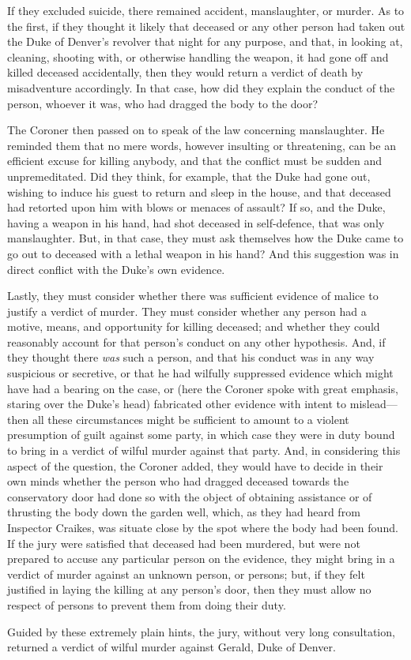 If they excluded suicide, there remained accident, manslaughter, or murder. As to the first, if they thought it likely that deceased or any other person had taken out the Duke of Denver's revolver that night for any purpose, and that, in looking at, cleaning, shooting with, or otherwise handling the weapon, it had gone off and killed deceased accidentally, then they would return a verdict of death by misadventure accordingly. In that case, how did they explain the conduct of the person, whoever it was, who had dragged the body to the door?

The Coroner then passed on to speak of the law concerning manslaughter.  He reminded them that no mere words, however insulting or threatening, can be an efficient excuse for killing anybody, and that the conflict must be sudden and unpremeditated. Did they think, for example, that the Duke had gone out, wishing to induce his guest to return and sleep in the house, and that deceased had retorted upon him with blows or menaces of assault? If so, and the Duke, having a weapon in his hand, had shot deceased in self-defence, that was only manslaughter. But, in that case, they must ask themselves how the Duke came to go out to deceased with a lethal weapon in his hand? And this suggestion was in direct conflict with the Duke's own evidence.

Lastly, they must consider whether there was sufficient evidence of malice to justify a verdict of murder. They must consider whether any person had a motive, means, and opportunity for killing deceased; and whether they could reasonably account for that person's conduct on any other hypothesis. And, if they thought there \textit{was} such a person, and that his conduct was in any way suspicious or secretive, or that he had wilfully suppressed evidence which might have had a bearing on the case, or (here the Coroner spoke with great emphasis, staring over the Duke's head) fabricated other evidence with intent to mislead—then all these circumstances might be sufficient to amount to a violent presumption of guilt against some party, in which case they were in duty bound to bring in a verdict of wilful murder against that party.  And, in considering this aspect of the question, the Coroner added, they would have to decide in their own minds whether the person who had dragged deceased towards the conservatory door had done so with the object of obtaining assistance or of thrusting the body down the garden well, which, as they had heard from Inspector Craikes, was situate close by the spot where the body had been found. If the jury were satisfied that deceased had been murdered, but were not prepared to accuse any particular person on the evidence, they might bring in a verdict of murder against an unknown person, or persons; but, if they felt justified in laying the killing at any person's door, then they must allow no respect of persons to prevent them from doing their duty.

Guided by these extremely plain hints, the jury, without very long consultation, returned a verdict of wilful murder against Gerald, Duke of Denver.
